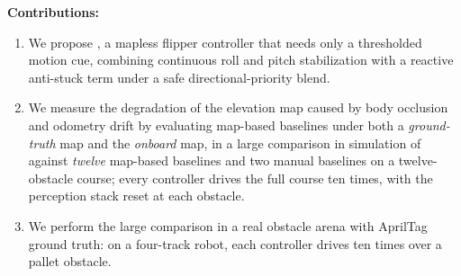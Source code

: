 %
\textbf{Contributions:}
\nopagebreak
\begin{enumerate}
  \item We propose \SAS, a mapless flipper controller that needs only a
  thresholded motion cue, combining continuous roll and pitch stabilization with a reactive
  anti-stuck term under a safe directional-priority blend.
  \item We measure the degradation of the elevation map caused by body occlusion and
  odometry drift by evaluating map-based baselines under both a \emph{ground-truth} map and
  the \emph{onboard} map, in a large comparison in simulation of \SAS{} against \emph{twelve}
  map-based baselines and two manual baselines on a twelve-obstacle course; every controller
  drives the full course ten times, with the perception stack reset at each obstacle.
  \item We perform the large comparison in a real obstacle arena with AprilTag ground
  truth: on a four-track robot, each controller drives ten times over a pallet obstacle.
\end{enumerate}
